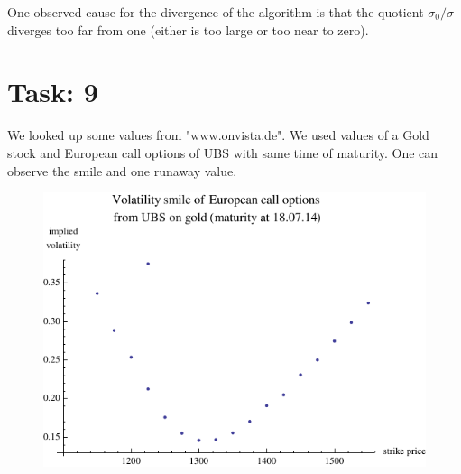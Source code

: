 \documentclass{article}
\begin{document}
One observed cause for the divergence of the algorithm is that the quotient $\sigma_0 / \sigma$ diverges too far from one (either is too large or too near to zero).

\newpage

\section*{Task: 9}
We looked up some values from "{}www.onvista.de"{}. %
We used values of a Gold stock and European call options of UBS with same time of maturity.%
One can observe the smile and one runaway value.
\begin{figure}[htbp]
  \centering
     \includegraphics[width=1.0\textwidth]{../Task09/smileFromExternalData.pdf}
\end{figure}
\end{document}
